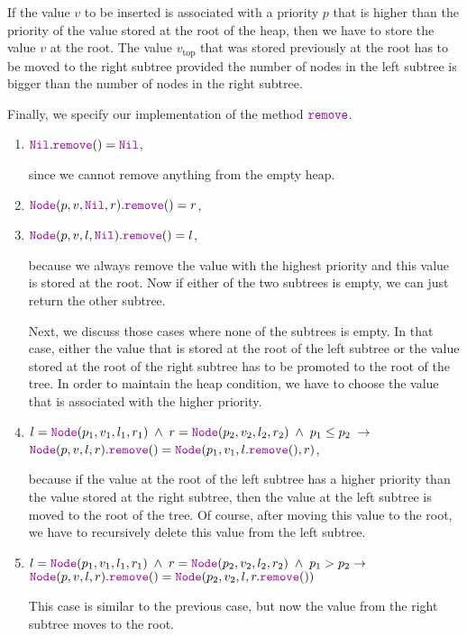 \begin{enumerate}
      If the value $v$ to be inserted is associated with a priority $p$ that is higher than the priority of
      the value stored at the root of the heap, then we have to store the value $v$ at the root.
      The value $v_\mathrm{top}$ that was stored previously at the root has to be moved to 
      the right subtree provided the number of nodes in the left subtree is bigger than
      the number of nodes in the right subtree.
\end{enumerate}
Finally, we specify our implementation of the method $\mytt{remove}$.
\begin{enumerate}
\item $\mytt{Nil}.\mytt{remove}() = \mytt{Nil}$,

      since we cannot remove anything from the empty heap.
\item $\mytt{Node}(p,v,\mytt{Nil},r).\mytt{remove}() = r$,
  
\item $\mytt{Node}(p,v,l,\mytt{Nil}).\mytt{remove}() = l$,

      because we always remove the value with the highest priority and this value is stored at the
      root.  Now if either of the two subtrees is empty, we can just return the other subtree.

      Next, we discuss those cases where none of the subtrees is empty.
      In that case, either the value that is stored at the root of the left subtree or the value
      stored at the root of the right subtree has to be promoted to the root of the tree.
      In order to maintain the heap condition, we have to choose the value that is associated with the
      higher priority.
\item $l = \mytt{Node}(p_1,v_1,l_1,r_1) \;\wedge\; r = \mytt{Node}(p_2,v_2,l_2,r_2) \;\wedge\; p_1 \leq p_2 \;\rightarrow$ \\[0.1cm] 
      \hspace*{1.3cm} 
      $\mytt{Node}(p,v,l,r).\mytt{remove}() =      \mytt{Node}(p_1,v_1,l.\mytt{remove}(),r)$,

      because if the value at the root of the left subtree has a higher priority than the value
      stored at the right subtree, then the value at the left subtree is moved to the root of the tree.
      Of course, after moving this value to the root, we have to recursively delete this value from
      the left subtree.
\item $l = \mytt{Node}(p_1,v_1,l_1,r_1) \;\wedge\; r = \mytt{Node}(p_2,v_2,l_2,r_2) \;\wedge\; p_1 > p_2 \rightarrow$ \\[0.1cm]
      \hspace*{1.3cm} 
      $\mytt{Node}(p,v,l,r).\mytt{remove}() = \mytt{Node}(p_2,v_2,l,r.\mytt{remove}())$

      This case is similar to the previous case, but now the value from the right subtree moves to
      the root.
\end{enumerate}
